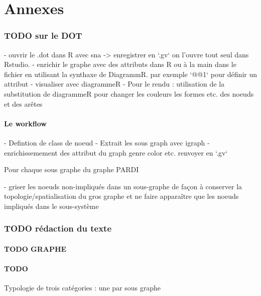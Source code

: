 \part*{Annexes}



\section{ TODO sur le DOT}



- ouvrir le .dot dans R avec sna -> enregistrer en `.gv` on l'ouvre tout seul dans Rstudio.
- enrichir le graphe avec des attributs dans R ou à la main dans le fichier en utilisant la synthaxe de DiagrammR. par exemple `@@1` pour définir un attribut
- visualiser avec diagrammeR
- Pour le rendu : utilisation de la substitution de diagrammeR pour changer les couleurs les formes etc.  des noeuds et des arêtes

\subsection{ Le workflow}
- Defintion de class de noeud
- Extrait les sous graph avec igraph
- enrichissemement des attribut du graph genre color etc.
renvoyer en `.gv`

Pour chaque sous graphe du graphe PARDI

-  griser les noeuds non-impliqués dans un sous-graphe de façon à conserver la topologie/spatialisation du gros graphe et ne faire apparaître que les noeuds impliqués dans le sous-système



\section{TODO rédaction du texte }

\subsection{TODO GRAPHE}

\subsection{ TODO }

Typologie de trois catégories : une par sous graphe

